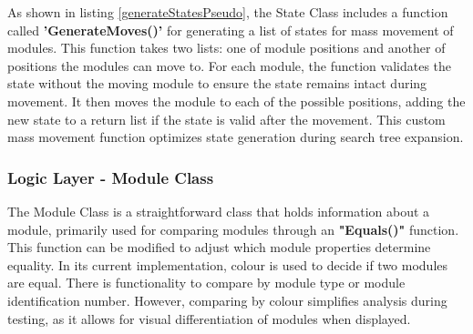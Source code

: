 As shown in listing \ref{generateStatesPseudo}, the State Class includes a function called \textbf{'GenerateMoves()'} for generating a list of states for mass movement of modules. This function takes two lists: one of module positions and another of positions the modules can move to. For each module, the function validates the state without the moving module to ensure the state remains intact during movement. It then moves the module to each of the possible positions, adding the new state to a return list if the state is valid after the movement. This custom mass movement function optimizes state generation during search tree expansion.

\subsubsection{Logic Layer - Module Class}
The Module Class is a straightforward class that holds information about a module, primarily used for comparing modules through an \textbf{"Equals()"} function. This function can be modified to adjust which module properties determine equality. In its current implementation, colour is used to decide if two modules are equal. There is functionality to compare by module type or module identification number. However, comparing by colour simplifies analysis during testing, as it allows for visual differentiation of modules when displayed.